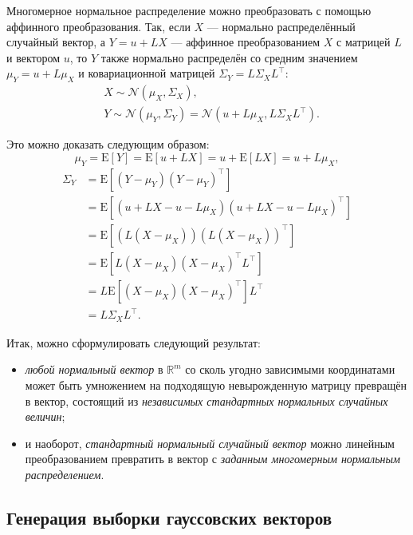 \documentclass[11pt,a4paper]{article}
\providecommand{\tightlist}{%
      \setlength{\itemsep}{0pt}\setlength{\parskip}{0pt}}
\begin{document}
Многомерное нормальное распределение можно преобразовать с помощью
аффинного преобразования. Так, если \(X\) --- нормально распределённый
случайный вектор, а \(Y = u + LX\) --- аффинное преобразованием \(X\) с
матрицей \(L\) и вектором \(u\), то \(Y\) также нормально распределён со
средним значением \(\mu_{Y} = u + L\mu_{X}\) и ковариационной матрицей
\(\Sigma_{Y} = L\Sigma_{X}L^\top\):
\[
\begin{split}
&X \sim \mathcal{N}(\mu_{X}, \Sigma_{X}),\\
&Y \sim \mathcal{N}(\mu_{Y}, \Sigma_{Y}) = \mathcal{N}(u + L\mu_{X}, L\Sigma_{X}L^\top).
\end{split}
\]

Это можно доказать следующим образом: \[
  \mu_{Y} = \mathrm{E}[Y] = \mathrm{E}[u + LX] = u + \mathrm{E}[LX] = u + L\mu_{X},
\]
\[
\begin{split}
  \Sigma_{Y} & = \mathrm{E}[(Y-\mu_{Y})(Y-\mu_{Y})^\top] \\
             & = \mathrm{E}[(u+LX - u-L\mu_{X})(u+LX - u-L\mu_{X})^\top] \\
             & = \mathrm{E}[(L(X-\mu_{X})) (L(X-\mu_{X}))^\top] \\
             & = \mathrm{E}[L(X-\mu_{X}) (X-\mu_{X})^\top L^\top] \\
             & = L\mathrm{E}[(X-\mu_{X})(X-\mu_{X})^\top]L^\top \\
             & = L\Sigma_{X}L^\top.
\end{split}
\]

    Итак, можно сформулировать следующий результат:

\begin{itemize}
\tightlist
\item
  \emph{любой нормальный вектор} в \(\mathbb{R}^m\) со сколь угодно
  зависимыми координатами может быть умножением на подходящую
  невырожденную матрицу превращён в вектор, состоящий из
  \emph{независимых стандартных нормальных случайных величин};
\item
  и наоборот, \emph{стандартный нормальный случайный вектор} можно
  линейным преобразованием превратить в вектор с \emph{заданным
  многомерным нормальным распределением}.
\end{itemize}

    \hypertarget{ux433ux435ux43dux435ux440ux430ux446ux438ux44f-ux432ux44bux431ux43eux440ux43aux438-ux433ux430ux443ux441ux441ux43eux432ux441ux43aux438ux445-ux432ux435ux43aux442ux43eux440ux43eux432}{%
\subsection{Генерация выборки гауссовских
векторов}\label{ux433ux435ux43dux435ux440ux430ux446ux438ux44f-ux432ux44bux431ux43eux440ux43aux438-ux433ux430ux443ux441ux441ux43eux432ux441ux43aux438ux445-ux432ux435ux43aux442ux43eux440ux43eux432}}
\end{document}

